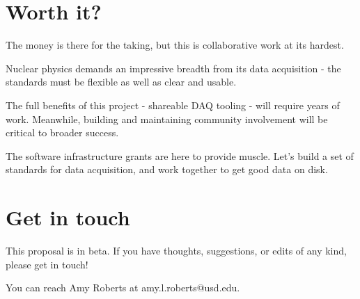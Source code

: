 \documentclass[]{report}   %
\begin{document}
 
\section*{Worth it?}     %
The money is there for the taking, but this is collaborative work at its hardest.  

Nuclear physics demands an impressive breadth from its data acquisition - the standards must be flexible as well as clear and usable.

The full benefits of this project - shareable DAQ tooling - will require years of work.  Meanwhile, building and maintaining community involvement will be critical to broader success.

The software infrastructure grants are here to provide muscle.  Let's build a set of standards for data acquisition, and work together %
to get good data on disk.

\section*{Get in touch}
This proposal is in beta.  If you have thoughts, suggestions, or edits of any kind, please get in touch!

You can reach Amy Roberts at amy.l.roberts@usd.edu.
\end{document}
